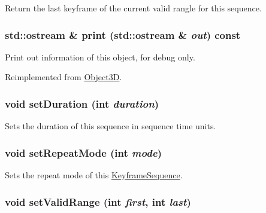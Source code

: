 Return the last keyframe of the current valid rangle for this sequence. \hypertarget{classm3g_1_1KeyframeSequence_6fea17fa1532df3794f8cb39cb4f911f}{
\subsubsection[{print}]{\setlength{\rightskip}{0pt plus 5cm}std::ostream \& print (std::ostream \& {\em out}) const}}
\label{classm3g_1_1KeyframeSequence_6fea17fa1532df3794f8cb39cb4f911f}


Print out information of this object, for debug only. 

Reimplemented from \hyperlink{classm3g_1_1Object3D_6fea17fa1532df3794f8cb39cb4f911f}{Object3D}.\hypertarget{classm3g_1_1KeyframeSequence_d7406d5e0e2f398e05e3563d099dfdf1}{
\subsubsection[{setDuration}]{\setlength{\rightskip}{0pt plus 5cm}void setDuration (int {\em duration})}}
\label{classm3g_1_1KeyframeSequence_d7406d5e0e2f398e05e3563d099dfdf1}


Sets the duration of this sequence in sequence time units. \hypertarget{classm3g_1_1KeyframeSequence_e5cd1486fe0a8a61cf96816e976d7f87}{
\subsubsection[{setRepeatMode}]{\setlength{\rightskip}{0pt plus 5cm}void setRepeatMode (int {\em mode})}}
\label{classm3g_1_1KeyframeSequence_e5cd1486fe0a8a61cf96816e976d7f87}


Sets the repeat mode of this \hyperlink{classm3g_1_1KeyframeSequence}{KeyframeSequence}. \hypertarget{classm3g_1_1KeyframeSequence_b5a824131cef547816366141afe0339a}{
\subsubsection[{setValidRange}]{\setlength{\rightskip}{0pt plus 5cm}void setValidRange (int {\em first}, \/  int {\em last})}}
\label{classm3g_1_1KeyframeSequence_b5a824131cef547816366141afe0339a}


